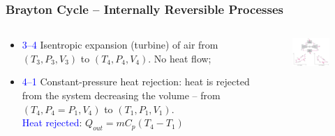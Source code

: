 \documentclass[10pt,compress]{beamer}
\begin{document}
\begin{frame}
 \frametitle{Brayton Cycle -- Internally Reversible Processes}
 \begin{columns}
  \begin{column}[c]{0.4\linewidth} 
   \begin{itemize}
    \item <1-> \textcolor{blue}{3--4} Isentropic expansion (turbine) of air from $\left(T_{3},P_{3},V_{3}\right)$ to $\left(T_{4},P_{4},V_{4}\right)$. No heat flow;
    \item <2-> \textcolor{blue}{4--1} Constant-pressure heat rejection: heat is rejected from the system decreasing the volume -- from $\left(T_{4},P_{4}=P_{1},V_{4}\right)$ to $\left(T_{1},P_{1},V_{1}\right)$. \\
\textcolor{blue}{Heat rejected}: $Q_{out}=mC_{p}\left(T_{4}-T_{1}\right)$
   \end{itemize}
  \end{column}
  \begin{column}[c]{0.6\linewidth}
    \begin{center}
   \begin{figure}%
     \includegraphics[height=6.cm,width=6.5cm,clip]{./Pics/Brayton_cycle1}
   \end{figure}  
    \end{center}
  \end{column}  
 \end{columns}
\end{frame}
\end{document}
